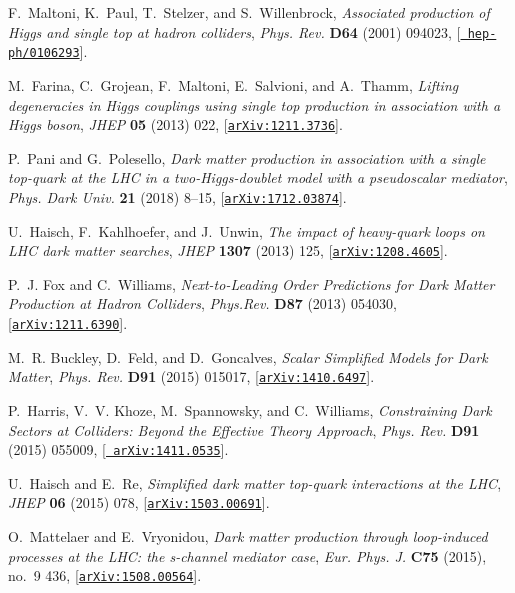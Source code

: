 \documentclass[review]{elsarticle}
\begin{document}
\begin{thebibliography}{100}
F.~Maltoni, K.~Paul, T.~Stelzer, and S.~Willenbrock, {\it {Associated
  production of Higgs and single top at hadron colliders}},  {\em Phys. Rev.}
  {\bf D64} (2001) 094023, [\href{http://arxiv.org/abs/hep-ph/0106293}{{\tt
  hep-ph/0106293}}].

M.~Farina, C.~Grojean, F.~Maltoni, E.~Salvioni, and A.~Thamm, {\it {Lifting
  degeneracies in Higgs couplings using single top production in association
  with a Higgs boson}},  {\em JHEP} {\bf 05} (2013) 022,
  [\href{http://arxiv.org/abs/1211.3736}{{\tt arXiv:1211.3736}}].

P.~Pani and G.~Polesello, {\it {Dark matter production in association with a
  single top-quark at the LHC in a two-Higgs-doublet model with a pseudoscalar
  mediator}},  {\em Phys. Dark Univ.} {\bf 21} (2018) 8--15,
  [\href{http://arxiv.org/abs/1712.03874}{{\tt arXiv:1712.03874}}].

U.~Haisch, F.~Kahlhoefer, and J.~Unwin, {\it {The impact of heavy-quark loops
  on LHC dark matter searches}},  {\em JHEP} {\bf 1307} (2013) 125,
  [\href{http://arxiv.org/abs/1208.4605}{{\tt arXiv:1208.4605}}].

P.~J. Fox and C.~Williams, {\it {Next-to-Leading Order Predictions for Dark
  Matter Production at Hadron Colliders}},  {\em Phys.Rev.} {\bf D87} (2013)
  054030, [\href{http://arxiv.org/abs/1211.6390}{{\tt arXiv:1211.6390}}].

M.~R. Buckley, D.~Feld, and D.~Goncalves, {\it {Scalar Simplified Models for
  Dark Matter}},  {\em Phys. Rev.} {\bf D91} (2015) 015017,
  [\href{http://arxiv.org/abs/1410.6497}{{\tt arXiv:1410.6497}}].

P.~Harris, V.~V. Khoze, M.~Spannowsky, and C.~Williams, {\it {Constraining Dark
  Sectors at Colliders: Beyond the Effective Theory Approach}},  {\em Phys.
  Rev.} {\bf D91} (2015) 055009, [\href{http://arxiv.org/abs/1411.0535}{{\tt
  arXiv:1411.0535}}].

U.~Haisch and E.~Re, {\it {Simplified dark matter top-quark interactions at the
  LHC}},  {\em JHEP} {\bf 06} (2015) 078,
  [\href{http://arxiv.org/abs/1503.00691}{{\tt arXiv:1503.00691}}].

O.~Mattelaer and E.~Vryonidou, {\it {Dark matter production through
  loop-induced processes at the LHC: the s-channel mediator case}},  {\em Eur.
  Phys. J.} {\bf C75} (2015), no.~9 436,
  [\href{http://arxiv.org/abs/1508.00564}{{\tt arXiv:1508.00564}}].


\end{thebibliography}
\end{document}
